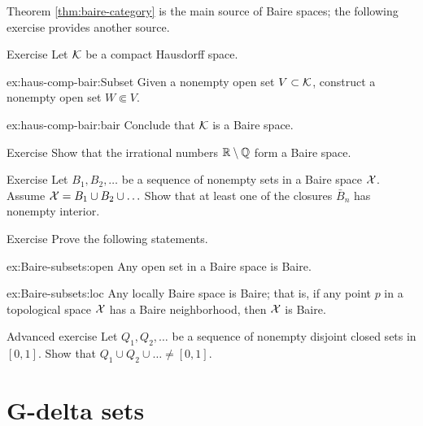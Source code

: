 Theorem \ref{thm:baire-category} is the main source of Baire spaces;
the following exercise provides another source.

\begin{thm}{Exercise}\label{ex:haus-comp-bair}
Let $\mathcal{K}$ be a compact Hausdorff space.
\begin{subthm}{ex:haus-comp-bair:Subset}
Given a nonempty open set $V\subset \mathcal{K}$, construct a nonempty open set $W\Subset V$.
\end{subthm}
\begin{subthm}{ex:haus-comp-bair:bair}
Conclude that $\mathcal{K}$ is a Baire space.
\end{subthm}

\end{thm}

\begin{thm}{Exercise}\label{ex:irrational-baire}
Show that the irrational numbers $\mathbb{R}\setminus\mathbb{Q}$ form a Baire space.
\end{thm}

\begin{thm}{Exercise}\label{ex:union-closures}
Let $B_1,B_2,\ldots$ be a sequence of nonempty sets in a Baire space $\mathcal{X}$.
Assume $\c{X}=B_1\z\cup B_2\cup\ldots$
Show that at least one of the closures $\bar B_n$ has nonempty interior.
\end{thm}

\begin{thm}{Exercise}\label{ex:Baire-subsets}
Prove the following statements.

\begin{subthm}{ex:Baire-subsets:open}
Any open set in a Baire space is Baire.
\end{subthm}

\begin{subthm}{ex:Baire-subsets:loc}
Any locally Baire space is Baire; that is, if any point $p$ in a topological space $\mathcal{X}$ has a Baire neighborhood, then $\mathcal{X}$ is Baire.
\end{subthm}

\end{thm}

\begin{thm}{Advanced exercise}\label{ex:disjoint-closed}
Let $Q_1,Q_2,\ldots$ be a sequence of nonempty disjoint closed sets in $[0,1]$.
Show that
$Q_1\cup Q_2\cup\dots\ne [0,1]$.
\end{thm}


\section{G-delta sets}

